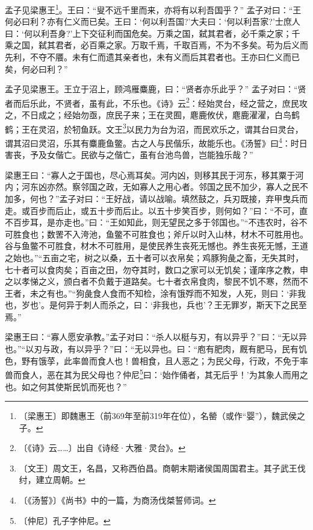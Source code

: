 \documentclass[12pt,UTF-8,openany,a4]{ctexbook}
\begin{document}
\begin{large}
    
    孟子见梁惠王\footnote{〔梁惠王〕\yiwen 即魏惠王（前369年至前319年在位），名罃（或作“婴”），魏武侯之子。}。王曰：“叟不远千里而来，亦将有以利吾国乎？” 孟子对曰：“王何必曰利？亦有仁义而已矣。王曰：‘何以利吾国?’大夫曰：‘何以利吾家?’士庶人曰：‘何以利吾身?’上下交征利而国危矣。万乘之国，弑其君者，必千乘之家；千乘之国，弑其君者，必百乘之家。万取千焉，千取百焉，不为不多矣。苟为后义而先利，不夺不餍。未有仁而遗其亲者也，未有义而后其君者也。王亦曰仁义而已矣，何必曰利？”
    
    孟子见梁惠王。王立于沼上，顾鸿雁麋鹿，曰：“贤者亦乐此乎？” 孟子对曰：“贤者而后乐此，不贤者，虽有此，不乐也。《诗》云\footnote{〔《诗》云……〕\yiwen 出自《诗经·大雅·灵台》。}：经始灵台，经之营之，庶民攻之，不日成之；经始勿亟，庶民子来；王在灵囿，麀鹿攸伏，麀鹿濯濯，白鸟鹤鹤；王在灵沼，於牣鱼跃。文王\footnote{〔文王〕\yiwen 周文王，名昌，又称西伯昌。商朝末期诸侯国周国君主。其子武王伐纣，建立周朝。}以民力为台为沼，而民欢乐之，谓其台曰灵台，谓其沼曰灵沼，乐其有麋鹿鱼鳖。古之人与民偕乐，故能乐也。《汤誓》曰\footnote{〔《汤誓》〕\yiwen 《尚书》中的一篇，为商汤伐桀誓师词。}：时日害丧，予及女偕亡。民欲与之偕亡，虽有台池鸟兽，岂能独乐哉？”
    
    梁惠王曰：“寡人之于国也，尽心焉耳矣。河内凶，则移其民于河东，移其粟于河内；河东凶亦然。察邻国之政，无如寡人之用心者。邻国之民不加少，寡人之民不加多，何也？”孟子对曰：“王好战，请以战喻。填然鼓之，兵刃既接，弃甲曳兵而走。或百步而后止，或五十步而后止。以五十步笑百步，则何如？”曰：“不可，直不百步耳，是亦走也。”曰：“王如知此，则无望民之多于邻国也。”“不违农时，谷不可胜食也；数罟不入洿池，鱼鳖不可胜食也；斧斤以时入山林，材木不可胜用也。谷与鱼鳖不可胜食，材木不可胜用，是使民养生丧死无憾也。养生丧死无憾，王道之始也。”“五亩之宅，树之以桑，五十者可以衣帛矣；鸡豚狗彘之畜，无失其时，七十者可以食肉矣；百亩之田，勿夺其时，数口之家可以无饥矣；谨庠序之教，申之以孝悌之义，颁白者不负戴于道路矣。七十者衣帛食肉，黎民不饥不寒，然而不王者，未之有也。”“狗彘食人食而不知检，涂有饿殍而不知发，人死，则曰：‘非我也，岁也’。是何异于刺人而杀之，曰：‘非我也，兵也’？王无罪岁，斯天下之民至焉。”
    
    梁惠王曰：“寡人愿安承教。”孟子对曰：“杀人以梃与刃，有以异乎？”曰：“无以异也。”“以刃与政，有以异乎？”曰：“无以异也。曰：“庖有肥肉，厩有肥马，民有饥色，野有饿莩，此率兽而食人也！兽相食，且人恶之；为民父母，行政，不免于率兽而食人，恶在其为民父母也？仲尼\footnote{〔仲尼〕\yiwen 孔子字仲尼。}曰：‘始作俑者，其无后乎！’为其象人而用之也。如之何其使斯民饥而死也？”
    

\end{large}
\end{document}
